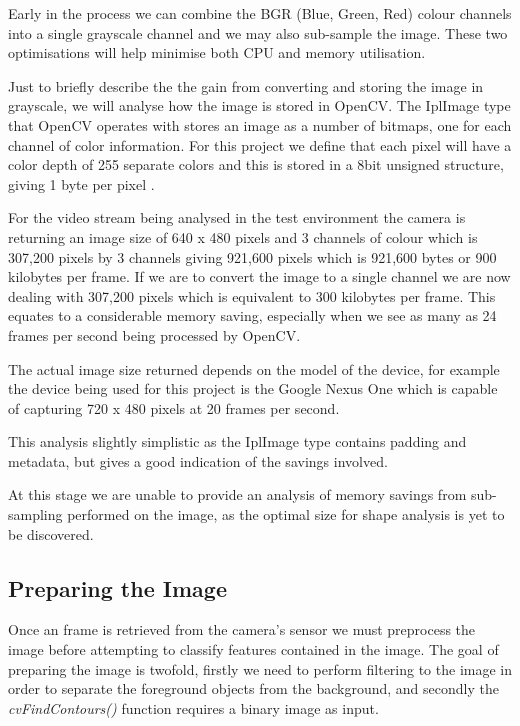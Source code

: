 Early in the process we can combine the BGR (Blue, Green, Red) colour channels into a single grayscale channel and we may also sub-sample the image. These two optimisations will help minimise both CPU and memory utilisation.

Just to briefly describe the the gain from converting and storing the image in grayscale, we will analyse how the image is stored in OpenCV. The IplImage type that OpenCV operates with stores an image as a number of bitmaps, one for each channel of color information. For this project we define that each pixel will have a color depth of 255 separate colors and this is stored in a 8bit unsigned structure, giving 1 byte per pixel \cite{morganIPL06}.

For the video stream being analysed in the test environment the camera is returning an image size of 640 x 480 pixels and 3 channels of colour which is 307,200 pixels by 3 channels giving 921,600 pixels which is 921,600 bytes or 900 kilobytes per frame.  If we are to convert the image to a single channel we are now dealing with 307,200 pixels which is equivalent to 300 kilobytes per frame. This equates to a considerable memory saving, especially when we see as many as 24 frames per second being processed by OpenCV.

The actual image size returned depends on the model of the device, for example the device being used for this project is the Google Nexus One which is capable of capturing 720 x 480 pixels at 20 frames per second.

This analysis slightly simplistic as the IplImage type contains padding and metadata, but gives a good indication of the savings involved.

At this stage we are unable to provide an analysis of memory savings from sub-sampling performed on the image, as the optimal size for shape analysis is yet to be discovered.


\subsection{Preparing the Image}

Once an frame is retrieved from the camera’s sensor we must preprocess the image before attempting to classify features contained in the image. The goal of preparing the image is twofold, firstly we need to perform filtering to the image in order to separate the foreground objects from the background, and secondly the \emph{cvFindContours()} function requires a binary image as input.

